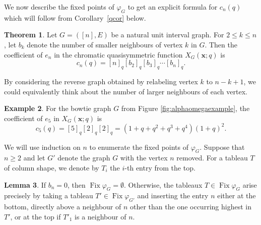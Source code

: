 \documentclass[12pt]{amsart}  %
\theoremstyle{definition}
\newtheorem{theorem}{Theorem}[section]
\newtheorem{lemma}[theorem]{Lemma}
\newtheorem{example}[theorem]{Example}
\theoremstyle{remark}
\numberwithin{equation}{section}
\DeclareMathOperator{\Fix}{Fix}
\begin{document}
We now describe the fixed points of $\varphi_G$ to get an explicit formula for $c_n(q)$ which will follow from Corollary~\ref{qcor} below.

\begin{theorem}\label{thm:coefen}
Let $G=([n],E)$ be a natural unit interval graph. For $2\leq k\leq n$, let $b_k$ denote the number of smaller neighbours of vertex $k$ in $G$. Then the coefficient of $e_n$ in the chromatic quasisymmetric function $X_G(\bm x;q)$ is 
\begin{equation}
c_n(q)=[n]_q[b_2]_q[b_3]_q\cdots[b_n]_q.
\end{equation}
\end{theorem}

By considering the reverse graph obtained by relabeling vertex $k$ to $n-k+1$, we could equivalently think about the number of larger neighbours of each vertex. 

\begin{example}
For the bowtie graph $G$ from Figure \ref{fig:alphaomegaexample}, the coefficient of $e_5$ in $X_G(\bm x;q)$ is \begin{equation}
c_5(q)=[5]_q[2]_q[2]_q=(1+q+q^2+q^3+q^4)(1+q)^2.
\end{equation}
\end{example}

We will use induction on $n$ to enumerate the fixed points of $\varphi_G$. Suppose that $n\geq 2$ and let $G'$ denote the graph $G$ with the vertex $n$ removed. For a tableau $T$ of column shape, we denote by $T_i$ the $i$-th entry from the top.

\begin{lemma}\label{lem:fixind}
If $b_n=0$, then $\Fix\varphi_G=\emptyset$. Otherwise, the tableaux $T\in\Fix\varphi_G$ arise precisely by taking a tableau $T'\in\Fix\varphi_{G'}$ and inserting the entry $n$ either at the bottom, directly above a neighbour of $n$ other than the one occurring highest in $T'$, or at the top if $T'_1$ is a neighbour of $n$. 
\end{lemma}
\end{document}
